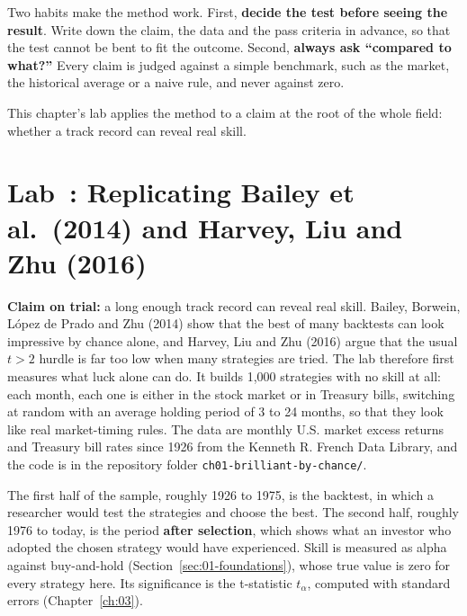 Two habits make the method work. First, \textbf{decide the test before seeing the result}. Write down the claim, the data and the pass criteria in advance, so that the test cannot be bent to fit the outcome. Second, \textbf{always ask ``compared to what?''} Every claim is judged against a simple benchmark, such as the market, the historical average or a naive rule, and never against zero.

This chapter's lab applies the method to a claim at the root of the whole field: whether a track record can reveal real skill.

\section{Lab~\thechapter: Replicating Bailey et al.\ (2014) and Harvey, Liu and Zhu (2016)}
\label{sec:01-lab}

\textbf{Claim on trial:} a long enough track record can reveal real skill. Bailey, Borwein, L\'opez de Prado and Zhu (2014) show that the best of many backtests can look impressive by chance alone, and Harvey, Liu and Zhu (2016) argue that the usual $t > 2$ hurdle is far too low when many strategies are tried. The lab therefore first measures what luck alone can do. It builds 1,000 strategies with no skill at all: each month, each one is either in the stock market or in Treasury bills, switching at random with an average holding period of 3 to 24 months, so that they look like real market-timing rules. The data are monthly U.S. market excess returns and Treasury bill rates since 1926 from the Kenneth R. French Data Library, and the code is in the repository folder \texttt{ch01-brilliant-by-chance/}.

The first half of the sample, roughly 1926 to 1975, is the backtest, in which a researcher would test the strategies and choose the best. The second half, roughly 1976 to today, is the period \textbf{after selection}, which shows what an investor who adopted the chosen strategy would have experienced. Skill is measured as alpha against buy-and-hold (Section~\ref{sec:01-foundations}), whose true value is zero for every strategy here. Its significance is the  t-statistic $t_\alpha$, computed with  standard errors (Chapter~\ref{ch:03}).

